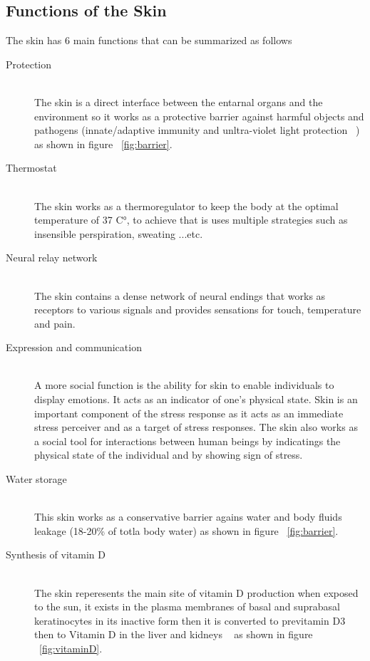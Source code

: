 \subsection{Functions of the Skin}
The skin has 6 main functions that can be summarized as follows~\cite{sarah2021}
\begin{description}
\item[Protection] \hfill \\
            The skin is a direct interface between the entarnal organs and the environment so it works as a protective barrier against harmful objects and pathogens (innate/adaptive immunity and unltra-violet light protection  ~\cite{joseph2020}) as shown in figure ~\ref{fig:barrier}.
            
\item[Thermostat] \hfill \\
            The skin works as a thermoregulator to keep the body at the optimal temperature of 37 C°, to achieve that is uses multiple strategies such as insensible perspiration, sweating ...etc.
\item[Neural relay network] \hfill \\
            The skin contains a dense network of neural endings that works as receptors to various signals and provides sensations for touch, temperature and pain.
\item[Expression and communication] \hfill \\
            A more social function
            is the ability for skin to enable individuals to display
            emotions. It acts as an indicator of one’s physical state.
            Skin is an important component of the stress response as it
            acts as an immediate stress perceiver and as a target of
            stress responses.
            The skin also works as a social tool for interactions between human beings by indicatings the physical state of the individual and by showing sign of stress.
\item[Water storage] \hfill \\
            This skin works as a conservative barrier agains water and body fluids leakage (18-20\% of totla body water) as shown in figure ~\ref{fig:barrier}.
\item[Synthesis of vitamin D] \hfill \\
            The skin reperesents the main site of vitamin D production when exposed to the sun, it exists in the plasma membranes of basal and suprabasal keratinocytes in its inactive form then it is converted to previtamin D3 then to Vitamin D in the liver and kidneys  ~\cite{joseph2020} as shown in figure ~\ref{fig:vitaminD}.
\end{description}
